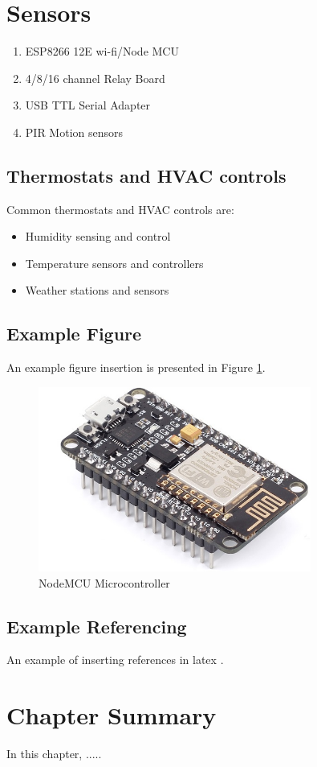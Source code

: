 \section{Sensors}
\begin{enumerate}
\item ESP8266 12E wi-fi/Node MCU	
\item 4/8/16 channel Relay Board				
\item USB TTL Serial Adapter
\item PIR Motion sensors 
\end{enumerate}

\subsection{Thermostats and HVAC controls}
Common thermostats and HVAC controls  are:
\begin{itemize}
\item 	Humidity sensing and control  
\item 	Temperature sensors and controllers    
\item 	Weather stations and sensors  
\end{itemize}

\subsection{Example Figure}
An example figure insertion is presented  in  Figure \ref{fig1}.

\begin{figure}[H]
\begin{center}
\includegraphics[width=0.8\textwidth]{fig1}
\end{center}
\caption{NodeMCU Microcontroller}
\label{fig1}
\end{figure}

\subsection{Example Referencing}
An example of inserting references in latex \cite{7890229} \cite{swapnil2016}. 

\section{Chapter Summary}
In this chapter, .....  
